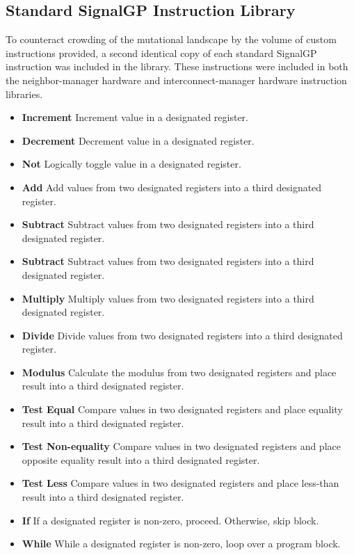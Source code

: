 \subsection{Standard SignalGP Instruction Library}

To counteract crowding of the mutational landscape by the volume of custom instructions provided, a second identical copy of each standard SignalGP instruction was included in the library.
These instructions were included in both the neighbor-manager hardware and interconnect-manager hardware instruction libraries.

\begin{itemize}
\item \textbf{Increment}
Increment value in a designated register.
\item \textbf{Decrement}
Decrement value in a designated register.
\item \textbf{Not}
Logically toggle value in a designated register.
\item \textbf{Add}
Add values from two designated registers into a third designated register.
\item \textbf{Subtract}
Subtract values from two designated registers into a third designated register.
\item \textbf{Subtract}
Subtract values from two designated registers into a third designated register.
\item \textbf{Multiply}
Multiply values from two designated registers into a third designated register.
\item \textbf{Divide}
Divide values from two designated registers into a third designated register.
\item \textbf{Modulus}
Calculate the modulus from two designated registers and place result into a third designated register.
\item \textbf{Test Equal}
Compare values in two designated registers and place equality result into a third designated register.
\item \textbf{Test Non-equality}
Compare values in two designated registers and place opposite equality result into a third designated register.
\item \textbf{Test Less}
Compare values in two designated registers and place less-than result into a third designated register.
\item \textbf{If}
If a designated register is non-zero, proceed.
Otherwise, skip block.
\item \textbf{While}
While a designated register is non-zero, loop over a program block.

\end{itemize}
